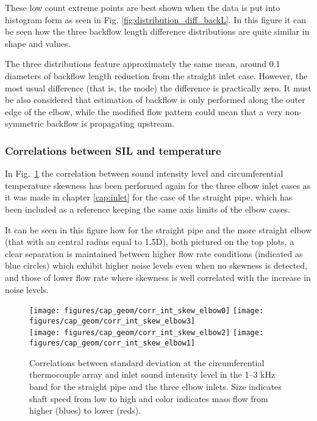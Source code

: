 These low count extreme points are best shown when the data is put into histogram form as seen in Fig. \ref{fig:distribution_diff_backL}. In this figure it can be seen how the three backflow length difference distributions are quite similar in shape and values.

The three distributions feature approximately the same mean, around 0.1 diameters of backflow length reduction from the straight inlet case. However, the most usual difference (that is, the mode) the difference is practically zero. It must be also considered that estimation of backflow is only performed along the outer edge of the elbow, while the modified flow pattern could mean that a very non-symmetric backflow is propagating upstream.

\subsubsection{Correlations between SIL and temperature}

In Fig.~\ref{fig:comp_corrs_skew_sil} the correlation between sound intensity level and circumferential temperature skewness has been performed again for the three elbow inlet cases as it was made in chapter \ref{cap:inlet} for the case of the straight pipe, which has been included as a reference keeping the same axis limits of the elbow cases.

It can be seen in this figure how for the straight pipe and the more straight elbow (that with an central radius equal to 1.5D), both pictured on the top plots, a clear separation is maintained between higher flow rate conditions (indicated as blue circles) which exhibit higher noise levels even when no skewness is detected, and those of lower flow rate where skewness is well correlated with the increase in noise levels.

\begin{figure}[t!]
\centering
\texttt{[image: figures/cap\_geom/corr\_int\_skew\_elbow0]}\hspace{4mm}
\texttt{[image: figures/cap\_geom/corr\_int\_skew\_elbow3]}\\[4mm]
\texttt{[image: figures/cap\_geom/corr\_int\_skew\_elbow2]}\hspace{4mm}
\texttt{[image: figures/cap\_geom/corr\_int\_skew\_elbow1]}
\caption[SIL vs. $\sigma$ temp. correlation for each geometry]{Correlations between standard deviation at the circumferential thermocouple array and inlet sound intensity level in the 1--3 kHz band for the straight pipe and the three elbow inlets. Size indicates shaft speed from low to high and color indicates mass flow from higher (blues) to lower (reds).}
\label{fig:comp_corrs_skew_sil}
\end{figure}

